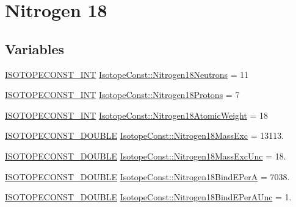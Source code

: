 \hypertarget{group___isotope_const-_nitrogen-_n18}{}\section{Nitrogen 18}
\label{group___isotope_const-_nitrogen-_n18}
\subsection*{Variables}
\begin{DoxyCompactItemize}
\item 
\mbox{\hyperlink{group___isotope_const-_macros_ga5f18360b3e99483a35c32d789e62621c}{I\+S\+O\+T\+O\+P\+E\+C\+O\+N\+S\+T\+\_\+\+I\+NT}} \mbox{\hyperlink{group___isotope_const-_nitrogen-_n18_gaf50e6340e1c6a8ca55fa02fe385c49a0}{Isotope\+Const\+::\+Nitrogen18\+Neutrons}} = 11
\item 
\mbox{\hyperlink{group___isotope_const-_macros_ga5f18360b3e99483a35c32d789e62621c}{I\+S\+O\+T\+O\+P\+E\+C\+O\+N\+S\+T\+\_\+\+I\+NT}} \mbox{\hyperlink{group___isotope_const-_nitrogen-_n18_ga448cfc67514445c052a1ecaf1ec8b10b}{Isotope\+Const\+::\+Nitrogen18\+Protons}} = 7
\item 
\mbox{\hyperlink{group___isotope_const-_macros_ga5f18360b3e99483a35c32d789e62621c}{I\+S\+O\+T\+O\+P\+E\+C\+O\+N\+S\+T\+\_\+\+I\+NT}} \mbox{\hyperlink{group___isotope_const-_nitrogen-_n18_ga26fe83428e6d1068cc67662c3a80ed95}{Isotope\+Const\+::\+Nitrogen18\+Atomic\+Weight}} = 18
\item 
\mbox{\hyperlink{group___isotope_const-_macros_ga8f45a7272ce02c0b4c65c44636ed719a}{I\+S\+O\+T\+O\+P\+E\+C\+O\+N\+S\+T\+\_\+\+D\+O\+U\+B\+LE}} \mbox{\hyperlink{group___isotope_const-_nitrogen-_n18_gab65512d009dc45da52b492702b7e2917}{Isotope\+Const\+::\+Nitrogen18\+Mass\+Exc}} = 13113.
\item 
\mbox{\hyperlink{group___isotope_const-_macros_ga8f45a7272ce02c0b4c65c44636ed719a}{I\+S\+O\+T\+O\+P\+E\+C\+O\+N\+S\+T\+\_\+\+D\+O\+U\+B\+LE}} \mbox{\hyperlink{group___isotope_const-_nitrogen-_n18_ga6ebe05f46cef020db78c733cb399394b}{Isotope\+Const\+::\+Nitrogen18\+Mass\+Exc\+Unc}} = 18.
\item 
\mbox{\hyperlink{group___isotope_const-_macros_ga8f45a7272ce02c0b4c65c44636ed719a}{I\+S\+O\+T\+O\+P\+E\+C\+O\+N\+S\+T\+\_\+\+D\+O\+U\+B\+LE}} \mbox{\hyperlink{group___isotope_const-_nitrogen-_n18_ga0c62e56bd30dfb4dc0653e1ce7296f92}{Isotope\+Const\+::\+Nitrogen18\+Bind\+E\+PerA}} = 7038.
\item 
\mbox{\hyperlink{group___isotope_const-_macros_ga8f45a7272ce02c0b4c65c44636ed719a}{I\+S\+O\+T\+O\+P\+E\+C\+O\+N\+S\+T\+\_\+\+D\+O\+U\+B\+LE}} \mbox{\hyperlink{group___isotope_const-_nitrogen-_n18_ga030572fd6d6e6543028c643bc1f94dd3}{Isotope\+Const\+::\+Nitrogen18\+Bind\+E\+Per\+A\+Unc}} = 1.

\end{DoxyCompactItemize}
